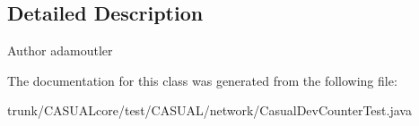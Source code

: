 \subsection{Detailed Description}
\begin{DoxyAuthor}{Author}
adamoutler 
\end{DoxyAuthor}


The documentation for this class was generated from the following file\-:\begin{DoxyCompactItemize}
\item 
trunk/\-C\-A\-S\-U\-A\-Lcore/test/\-C\-A\-S\-U\-A\-L/network/Casual\-Dev\-Counter\-Test.\-java\end{DoxyCompactItemize}
